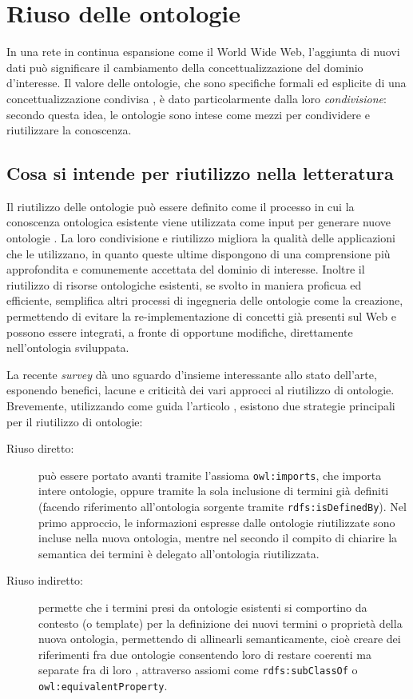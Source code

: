 \section{Riuso delle ontologie}
\label{sec:OntoReuse}
In una rete in continua espansione come il World Wide Web, l'aggiunta di nuovi dati può significare il cambiamento della concettualizzazione del dominio d'interesse. Il valore delle ontologie, che sono specifiche formali ed esplicite di una concettualizzazione condivisa \cite{goy2015ontologies}, è dato particolarmente dalla loro \textit{condivisione}: secondo questa idea, le ontologie sono intese come mezzi per condividere e riutilizzare la conoscenza.
\subsection{Cosa si intende per riutilizzo nella letteratura}
Il riutilizzo delle ontologie può essere definito come il processo in cui la conoscenza ontologica esistente viene utilizzata come input per generare nuove ontologie \cite{feasibilityStudy}. La loro condivisione e riutilizzo migliora la qualità delle applicazioni che le utilizzano, in quanto queste ultime dispongono di una comprensione più approfondita e comunemente accettata del dominio di interesse. Inoltre il riutilizzo di risorse ontologiche esistenti, se svolto in maniera proficua ed efficiente, semplifica altri processi di ingegneria delle ontologie come la creazione, permettendo di evitare la re-implementazione di concetti già presenti sul Web e possono essere integrati, a fronte di opportune modifiche, direttamente nell'ontologia sviluppata.

La recente \textit{survey} \cite{carriero2020OntoReuse} dà uno sguardo d'insieme interessante allo stato dell'arte, esponendo benefici, lacune e criticità dei vari approcci al riutilizzo di ontologie. Brevemente, utilizzando come guida l'articolo \cite{carriero2020OntoReuse}, esistono due strategie principali per il riutilizzo di ontologie:
\begin{description}
	\item[Riuso diretto:] può essere portato avanti tramite l'assioma \texttt{owl:imports}, che importa intere ontologie, oppure tramite la sola inclusione di termini già definiti (facendo riferimento all'ontologia sorgente tramite \texttt{rdfs:isDefinedBy}). Nel primo approccio, le informazioni espresse dalle ontologie riutilizzate sono incluse nella nuova ontologia, mentre nel secondo il compito di chiarire la semantica dei termini è delegato all'ontologia riutilizzata.
	\item[Riuso indiretto:] permette che i termini presi da ontologie esistenti si comportino da contesto (o template) per la definizione dei nuovi termini o proprietà della nuova ontologia, permettendo di allinearli semanticamente, cioè creare dei riferimenti fra due ontologie consentendo loro di restare coerenti ma separate fra di loro \cite{choi2006Mapping}, attraverso assiomi come \texttt{rdfs:subClassOf} o \texttt{owl:equivalentProperty}.
\end{description}

